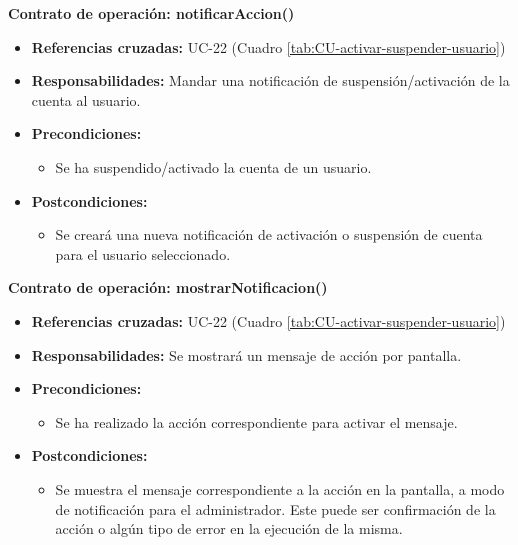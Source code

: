 \textbf{Contrato de operación: notificarAccion()}
\begin{itemize}
\item \textbf{Referencias cruzadas:} UC-22 (Cuadro \ref{tab:CU-activar-suspender-usuario})
\item \textbf{Responsabilidades:} Mandar una notificación de suspensión/activación de la cuenta al usuario.
\item \textbf{Precondiciones:} 
 \begin{itemize}
\item Se ha suspendido/activado la cuenta de un usuario.
\end {itemize}
\item \textbf{Postcondiciones:} 
 \begin{itemize}
\item Se creará una nueva notificación de activación o suspensión de cuenta para el usuario seleccionado.
\end {itemize}
\end {itemize}

\textbf{Contrato de operación: mostrarNotificacion()}
\begin{itemize}
\item \textbf{Referencias cruzadas:} UC-22 (Cuadro \ref{tab:CU-activar-suspender-usuario})
\item \textbf{Responsabilidades:} Se mostrará un mensaje de acción por pantalla.
\item \textbf{Precondiciones:} 
 \begin{itemize}
\item Se ha realizado la acción correspondiente para activar el mensaje.
\end {itemize}
\item \textbf{Postcondiciones:} 
 \begin{itemize}
\item Se muestra el mensaje correspondiente a la acción en la pantalla, a modo de notificación para el administrador. Este puede ser confirmación de la acción o algún tipo de error en la ejecución de la misma.
\end {itemize}
\end {itemize}


\vspace{7mm}
\dotfill
\vspace{7mm}

